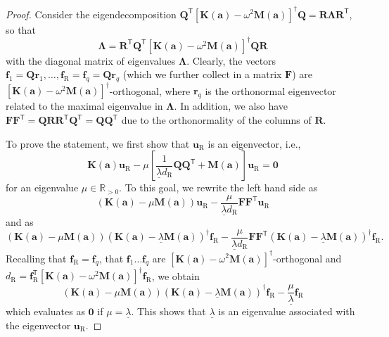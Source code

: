 \documentclass[preprint,3p]{elsarticle}
\newcommand{\T}{^{\mathsf T}}
\newcommand{\R}{\mathrm{R}}
\numberwithin{equation}{section}
\begin{document}
\begin{proof}
  Consider the eigendecomposition $\mathbf{Q}\T\left[\mathbf{K}(\mathbf{a}) - \omega^2 \mathbf{M}(\mathbf{a})\right]^\dagger\mathbf{Q} = \mathbf{R} \mathbf{\Lambda} \mathbf{R}\T$, so that
  \begin{equation}
    \mathbf{\Lambda} = \mathbf{R}\T \mathbf{Q}\T \left[\mathbf{K}(\mathbf{a}) - \omega^2 \mathbf{M}(\mathbf{a})\right]^\dagger \mathbf{Q}\mathbf{R}
  \end{equation}
  with the diagonal matrix of eigenvalues $\mathbf{\Lambda}$. Clearly, the vectors $\mathbf{f}_1 = \mathbf{Q} \mathbf{r}_1, \dots, \mathbf{f}_\R = \mathbf{f}_q = \mathbf{Q} \mathbf{r}_q$ (which we further collect in a matrix $\mathbf{F}$) are $\left[\mathbf{K}(\mathbf{a}) - \omega^2 \mathbf{M}(\mathbf{a})\right]^\dagger$-orthogonal, where $\mathbf{r}_q$ is the orthonormal eigenvector related to the maximal eigenvalue in $\mathbf{\Lambda}$. In addition, we also have $\mathbf{F}\mathbf{F}\T = \mathbf{Q} \mathbf{R} \mathbf{R}\T \mathbf{Q}\T = \mathbf{Q} \mathbf{Q}\T$ due to the orthonormality of the columns of $\mathbf{R}$.

  To prove the statement, we first show that $\mathbf{u}_\R$ is an eigenvector, i.e.,
  \begin{equation}
    \mathbf{K}(\mathbf{a}){\mathbf{u}_\R} - \mu \left[ \frac{1}{\underline{\lambda} {d}_\R} \mathbf{Q} \mathbf{Q}\T + \mathbf{M}(\mathbf{a})\right] {\mathbf{u}_\R} = \mathbf{0}
  \end{equation}
  for an eigenvalue $\mu \in \mathbb{R}_{>0}$.
  To this goal, we rewrite the left hand side as
  \begin{equation}
    \left(\mathbf{K}(\mathbf{a}) - \mu\mathbf{M}(\mathbf{a})\right) {\mathbf{u}}_\R - \frac{\mu}{\underline{\lambda} d_\R} \mathbf{F} \mathbf{F}\T\mathbf{u}_\R
  \end{equation}
  and as
  \begin{equation}
    \left(\mathbf{K}(\mathbf{a}) - \mu\mathbf{M}(\mathbf{a})\right) \left( \mathbf{K}(\mathbf{a}) - \underline{\lambda} \mathbf{M}(\mathbf{a}) \right)^\dagger \mathbf{f}_\R - \frac{\mu}{\underline{\lambda} d_\R} \mathbf{F}\mathbf{F}\T\left( \mathbf{K}(\mathbf{a}) - \underline{\lambda} \mathbf{M}(\mathbf{a}) \right)^\dagger \mathbf{f}_\R.
  \end{equation}
  Recalling that $\mathbf{f}_\R = \mathbf{f}_q$, that  $\mathbf{f}_1 \dots \mathbf{f}_q$ are $\left[\mathbf{K}(\mathbf{a}) - \omega^2 \mathbf{M}(\mathbf{a})\right]^\dagger$-orthogonal and $d_\R = \mathbf{f}_\R\T \left[\mathbf{K}(\mathbf{a}) - \omega^2 \mathbf{M}(\mathbf{a})\right]^\dagger \mathbf{f}_\R$, we obtain
  \begin{equation}
    \left(\mathbf{K}(\mathbf{a}) - \mu\mathbf{M}(\mathbf{a})\right) \left( \mathbf{K}(\mathbf{a}) - \underline{\lambda} \mathbf{M}(\mathbf{a}) \right)^\dagger \mathbf{f}_\R - \frac{\mu}{\underline{\lambda}} \mathbf{f}_\R
  \end{equation}
  which evaluates as $\mathbf{0}$ if $\mu = \underline{\lambda}$. This shows that $\underline{\lambda}$ is an eigenvalue associated with the eigenvector $\mathbf{u}_\R$.


\end{proof}
\end{document}
